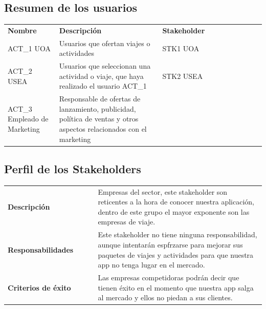 \documentclass[11pt]{article}
\begin{document}
\subsection{Resumen de los usuarios}
\begin{table}[H]
  \centering
  \begin{tabular}{p{0.2\linewidth}p{0.4\linewidth}p{0.4\linewidth}}
    \toprule
    \textbf{Nombre} & \textbf{Descripción} & \textbf{Stakeholder} \\
    ACT\_1 UOA & Usuarios que ofertan viajes o actividades & STK1 UOA\\
    ACT\_2 USEA & Usuarios que seleccionan una actividad o viaje, que haya realizado el usuario ACT\_1 & STK2 USEA\\
    ACT\_3  Empleado de Marketing& Responsable de ofertas de lanzamiento, publicidad, política de ventas y otros aspectos relacionados con el marketing &\\
    \midrule
    \bottomrule
  \end{tabular}
\end{table}

\subsection{Perfil de los Stakeholders}


\begin{table}[H]
  \centering
  \begin{tabular}{p{0.35\linewidth}|p{0.65\linewidth}}
    \toprule
    \textbf{Descripción} & Empresas del sector, este stakeholder son reticentes a la hora de conocer nuestra aplicación, dentro de este grupo el mayor exponente son las empresas de viaje.\\ 
    \textbf{Responsabilidades} & Este stakeholder no tiene ninguna responsabilidad, aunque intentarán espfrzarse para mejorar sus paquetes de viajes y actividades para que nuestra app no tenga lugar en el mercado. \\
    \textbf{Criterios de éxito} & Las empresas competidoras podrán decir que tienen éxito en el momento que nuestra app salga al mercado y ellos no piedan a sus clientes. \\
    \bottomrule
  \end{tabular}
\end{table}
\end{document}
